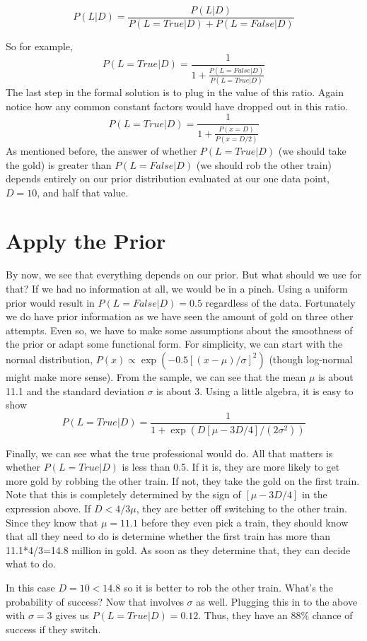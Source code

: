 \documentclass[12pt]{article}
\begin{document}
\begin{equation}
P(L | D) = \frac{P(L | D)}{P(L=True | D) + P(L=False | D)}
\end{equation}

So for example, 
\begin{equation}
P(L=True | D) = \frac{1}{1+\frac{P(L=False | D)}{P(L=True|D)}}
\end{equation}
The last step in the formal solution is to plug in the value of this ratio. Again notice how any
common constant factors would have dropped out in this ratio.  
\begin{equation}
P(L=True | D) = \frac{1}{1+\frac{P(x=D)}{P(x=D/2)}}
\label{eq:final}
\end{equation}
As mentioned before, the answer of whether $P(L=True | D)$ (we should take the gold) is greater than
$P(L=False | D)$ (we should rob the other train) depends entirely on our prior distribution evaluated at 
our one data point, $D=10$, and half that value. 

\section{Apply the Prior}
By now, we see that everything depends on our prior. But what should we use for that? If we had no information
at all, we would be in a pinch. Using a uniform prior would result in $P(L=False | D)=0.5$ regardless of the data. 
Fortunately we do have prior information as we have seen the amount of gold on three other attempts. Even so, we
have to make some assumptions about the smoothness of the prior or adapt some functional form. For simplicity, we
can start with the normal distribution, $P(x) \propto \exp(-0.5 \left[(x-\mu)/\sigma \right]^2)$ (though log-normal 
might make more sense). From the sample, we can see that the mean $\mu$ is about 11.1 and the standard deviation 
$\sigma$ is about 3. Using a little algebra, it is easy to show 
\begin{equation}
P(L=True | D) = \frac{1}{1+ \exp \left(D [\mu- 3 D/4]/(2 \sigma^2)\right)}
\label{eq:crit}
\end{equation}

Finally, we can see what the true professional would do. All that matters is whether $P(L=True | D)$ is less than 0.5.
If it is, they are more likely to get more gold by robbing the other train. If not, they take the gold on the first train. 
Note that this is completely determined by the sign of $[\mu- 3 D/4]$ in the expression above. If $D < 4/3 \mu$, they are
better off switching to the other train. Since they know that $\mu=11.1$ before they even pick a train, they should know
that all they need to do is determine whether the first train has more than 11.1*4/3=14.8 million in gold. As soon as they 
determine that, they can decide what to do. 

In this case $D=10 < 14.8$ so it is better to rob the other train. What's the probability of success? Now that 
involves $\sigma$ as well. Plugging this in to the above with $\sigma=3$ gives us $P(L=True | D) = 0.12$. 
Thus, they have an $88\%$ chance of success if they switch. 


 



 
\end{document}
